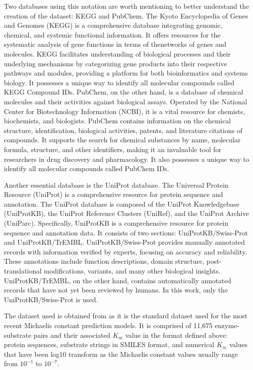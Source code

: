 Two databases using this notation are worth mentioning to better understand the creation of the dataset: KEGG and PubChem. \cite{kegg,pubchem} The Kyoto Encyclopedia of Genes and Genomes (KEGG) is a comprehensive database integrating genomic, chemical, and systemic functional information. It offers resources for the systematic analysis of gene functions in terms of thenetworks of genes and molecules. KEGG facilitates understanding of biological processes and their underlying mechanisms by categorizing gene products into their respective pathways and modules, providing a platform for both bioinformatics and systems biology. It possesses a unique way to identify all molecular compounds called KEGG Compound IDs. PubChem, on the other hand, is a database of chemical molecules and their activities against biological assays. Operated by the National Center for Biotechnology Information (NCBI), it is a vital resource for chemists, biochemists, and biologists. PubChem contains information on the chemical structure, identification, biological activities, patents, and literature citations of compounds. It supports the search for chemical substances by name, molecular formula, structure, and other identifiers, making it an invaluable tool for researchers in drug discovery and pharmacology. It also possesses a unique way to identify all molecular compounds called PubChem IDs.

Another essential database is the UniProt database. The Universal Protein Resource (UniProt) is a comprehensive resource for protein sequence and annotation. The UniProt database is composed of the UniProt Knowledgebase (UniProtKB), the UniProt Reference Clusters (UniRef), and the UniProt Archive (UniParc). Specifically, UniProtKB is a comprehensive resource for protein sequence and annotation data. It consists of two sections: UniProtKB/Swiss-Prot and UniProtKB/TrEMBL. UniProtKB/Swiss-Prot provides manually annotated records with information verified by experts, focusing on accuracy and reliability. These annotations include function descriptions, domain structure, post-translational modifications, variants, and many other biological insights. UniProtKB/TrEMBL, on the other hand, contains automatically annotated records that have not yet been reviewed by humans. In this work, only the UniProtKB/Swiss-Prot is used.

The dataset used is obtained from \citeauthor{km1} as it is the standard dataset used for the most recent Michaelis
constant prediction models. It is comprised of 11,675 enzyme-substrate pairs and their associated $K_m$ value in
the format defined above: protein sequences, substrate strings in SMILES format, and numerical $K_m$ values
that have been log10 transform as the Michaelis constant values usually range from $10^{-1}$ to  $10^{-7}$.

